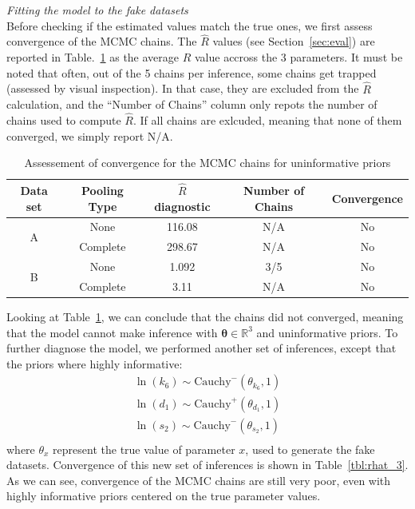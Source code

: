 \documentclass[11pt]{article}
\begin{document}
\textit{Fitting the model to the fake datasets}\\[5pt] 
Before checking if the estimated values match the true ones, we first assess convergence of the MCMC chains. The $\hat{R}$ values (see Section~\ref{sec:eval}) are reported in Table.~\ref{tbl:rhat_2} as the average $\hat{R}$ value accross the 3 parameters. It must be noted that often, out of the 5 chains per inference, some chains  get trapped (assessed by visual inspection). In that case, they are excluded from the $\hat{R}$ calculation, and the ``Number of Chains'' column only repots the number of chains used to compute $\hat{R}$. If all chains are exlcuded, meaning that none of them converged, we simply report N/A.

\begin{table}[!h]
    \centering
    \caption{Assessement of convergence for the MCMC chains for uninformative priors}
    \begin{tabular}{c|c||c|c|c}
        \hline
        Data set & Pooling Type & $\hat{R}$ diagnostic & Number of Chains & Convergence  \\ \hline 
        \multirow{2}{*}{A}      & None     & 116.08 & N/A & No \\
                                & Complete & 298.67 & N/A & No \\ \hline 
        \multirow{2}{*}{B}      & None     & 1.092  & 3/5 & No \\
                                & Complete & 3.11   & N/A & No \\ \hline 
    \end{tabular}
    \label{tbl:rhat_2}
\end{table}
Looking at Table~\ref{tbl:rhat_2}, we can conclude that the chains did not converged, meaning that the model cannot make inference with $\boldsymbol{\theta} \in \mathbb{R}^3$ and uninformative priors. To further diagnose the model, we performed another set of inferences, except that the priors where highly informative:
\begin{align*}
    \ln(k_6) \sim \text{Cauchy}^-(\theta_{k_6}, 1) \\ 
    \ln(d_1) \sim \text{Cauchy}^+(\theta_{d_1}, 1) \\ 
    \ln(s_2) \sim \text{Cauchy}^-(\theta_{s_2}, 1) \\ 
\end{align*} 
where $\theta_x$ represent the true value of parameter $x$, used to generate the fake datasets. Convergence of this new set of inferences is shown in Table~\ref{tbl:rhat_3}. As we can see, convergence of the MCMC chains are still very poor, even with highly informative priors centered on the true parameter values.
\end{document}
